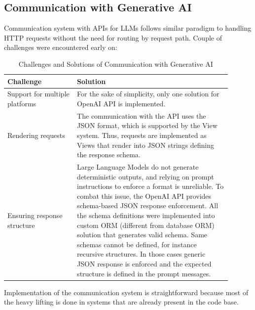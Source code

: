 \subsection{Communication with Generative AI}\label{subsec:communication-with-generative-ai}
Communication system with APIs for LLMs follows similar paradigm to handling HTTP requests without the need for routing by request path.
Couple of challenges were encountered early on:

\begin{table}[H]
    \centering
    \begin{tabular}{|p{0.28\linewidth}|p{0.62\linewidth}|}
        \hline
        \textbf{Challenge} & \textbf{Solution} \\
        \hline
        Support for multiple platforms
        &
        For the sake of simplicity, only one solution for OpenAI API is implemented. \\
        \hline
        Rendering requests
        &
        The communication with the API uses the JSON format, which is supported by the View system.
        Thus, requests are implemented as Views that render into JSON strings defining the response schema. \\
        \hline
        Ensuring response structure
        &
        Large Language Models do not generate deterministic outputs, and relying
        on prompt instructions to enforce a format is unreliable.
        To combat this issue, the OpenAI API provides schema-based JSON response enforcement.
        All the schema definitions were implemented into custom ORM (different from database ORM) solution that generates valid schema.
        Same schemas cannot be defined, for instance recursive structures.
        In those cases generic JSON response is enforced and the expected structure is defined in the prompt messages.
        \\
        \hline
    \end{tabular}
    \caption{Challenges and Solutions of Communication with Generative AI}
    \label{tab:csGenerativeAi}
\end{table}

Implementation of the communication system is straightforward because most of the heavy lifting is done in systems
that are already present in the code base.


